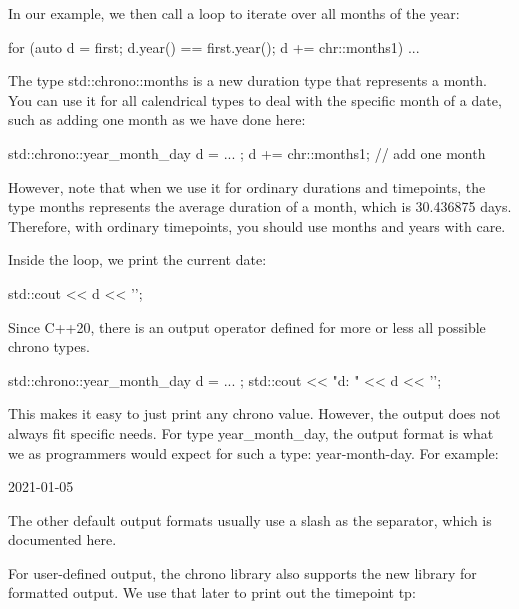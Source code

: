 
In our example, we then call a loop to iterate over all months of the year:

\begin{cpp}
for (auto d = first; d.year() == first.year(); d += chr::months{1}) {
	...
}
\end{cpp}

The type std::chrono::months is a new duration type that represents a month. You can use it for all calendrical types to deal with the specific month of a date, such as adding one month as we have done here:

\begin{cpp}
std::chrono::year_month_day d = ... ;
d += chr::months{1}; // add one month
\end{cpp}

However, note that when we use it for ordinary durations and timepoints, the type months represents the average duration of a month, which is 30.436875 days. Therefore, with ordinary timepoints, you should use months and years with care.


Inside the loop, we print the current date:

\begin{cpp}
std::cout << d << '\n';
\end{cpp}

Since C++20, there is an output operator defined for more or less all possible chrono types.

\begin{cpp}
std::chrono::year_month_day d = ... ;
std::cout << "d: " << d << '\n';
\end{cpp}

This makes it easy to just print any chrono value. However, the output does not always fit specific needs. For type year\_month\_day, the output format is what we as programmers would expect for such a type: year-month-day. For example:

\begin{shell}
2021-01-05
\end{shell}

The other default output formats usually use a slash as the separator, which is documented here.

For user-defined output, the chrono library also supports the new library for formatted output. We use that later to print out the timepoint tp:

